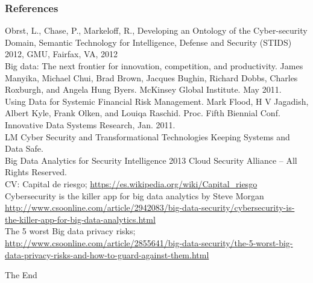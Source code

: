 \documentclass{beamer}
\begin{document}
\begin{frame}
\frametitle{References}
\footnotesize{
\begin{thebibliography}{1}
 Obrst, L., Chase, P., Markeloff, R., Developing an Ontology of the Cyber-security Domain, Semantic Technology for Intelligence, Defense and Security (STIDS) 2012, GMU, Fairfax, VA, 2012\\
 Big data: The next frontier for innovation, competition, and productivity. James Manyika, Michael Chui, Brad Brown, Jacques Bughin, Richard Dobbs, Charles Roxburgh, and Angela Hung Byers. McKinsey Global Institute. May 2011.\\
 Using Data for Systemic Financial Risk Management. Mark Flood, H V Jagadish, Albert Kyle, Frank Olken, and Louiqa Raschid. Proc. Fifth Biennial Conf. Innovative Data Systems Research, Jan. 2011.\\
 LM Cyber Security and Transformational Technologies Keeping Systems and Data Safe.\\
 Big Data Analytics for Security Intelligence 2013 Cloud Security Alliance – All Rights Reserved.\\
 CV: Capital de riesgo; \url{https://es.wikipedia.org/wiki/Capital_riesgo}\\
 Cybersecurity is the killer app for big data analytics by Steve Morgan \url{http://www.csoonline.com/article/2942083/big-data-security/cybersecurity-is-the-killer-app-for-big-data-analytics.html}\\
 The 5 worst Big data privacy risks; \url{http://www.csoonline.com/article/2855641/big-data-security/the-5-worst-big-data-privacy-risks-and-how-to-guard-against-them.html} \\
\end{thebibliography}
}
\end{frame}


\begin{frame}
\Huge{\centerline{The End}}
\end{frame}

\end{document}
